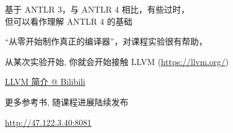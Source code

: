 \begin{frame}{}
  \begin{columns}
  \end{columns}

  \vspace{0.50cm}
  \begin{center}
    基于 ANTLR 3，与 ANTLR 4 相比，有些过时，\\[3pt]
    但可以看作理解 ANTLR 4 的基础
  \end{center}
\end{frame}

\begin{frame}{}
  \begin{center}
    ``从零开始制作真正的编译器''，对课程实验很有帮助，
  \end{center}
\end{frame}

\begin{frame}{}

  \begin{center}
    从某次实验开始, 你就会开始接触 LLVM (\url{https://llvm.org/})
  \end{center}
\end{frame}

\begin{frame}{}

  \vspace{0.20cm}
  \begin{center}
    \href{https://www.bilibili.com/video/BV1RF411K7F5/?vd_source=e3cbbf5ca80db268fa006d63626e267e}{LLVM 简介 @ Bilibili}
  \end{center}
\end{frame}

\begin{frame}{}
  \begin{center}

    \vspace{0.50cm}
    更多参考书, 随课程进展陆续发布

    \vspace{0.30cm}
    \url{http://47.122.3.40:8081}
  \end{center}
\end{frame}
